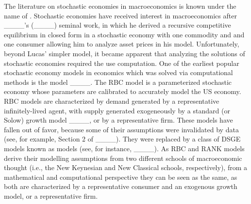 The literature on stochastic economies in macroeconomics is known under the name of . Stochastic economies have received interest in macroeconomics after ____'s (____) seminal work, in which he derived a recursive competitive equilibrium in closed form in a stochastic economy with one commodity and and one consumer allowing him to analyze asset prices in his model. Unfortunately, beyond Lucas' simpler model, it became apparent that analyzing the solutions of stochastic economies required the use computation. 
One of the earliest popular stochastic economy models in economics which was solved via computational methods is the  model ____. The RBC model is a parameterized stochastic economy whose parameters are calibrated to accurately model the US economy. RBC models are characterized by demand generated by a representative infinitely-lived agent, with supply generated exogeneously by a standard (or Solow) growth model ____, or by a representative firm.
These models have fallen out of favor, because some of their assumptions were invalidated by data (see, for example, Section 2 of ____).
They were replaced by a class of DSGE models known as  models (see, for instance, ____). As RBC and RANK models derive their modelling assumptions from two different schools of macroeconomic thought (i.e., the New Keynesian and New Classical schools, respectively),%
from a mathematical and computational perspective they can be seen as the same, as both are characterized by a representative consumer and an exogenous growth model, or a representative firm.

